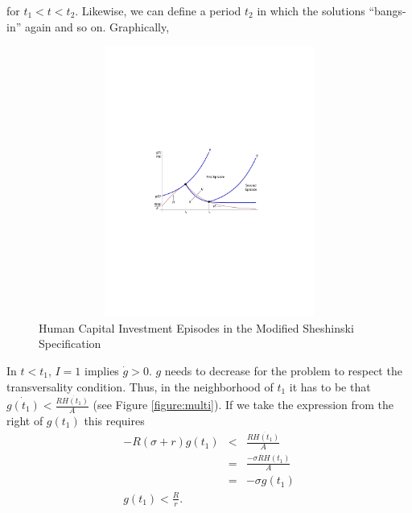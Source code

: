 \noindent for $t_{1} < t < t_{2}$. Likewise, we can define a period $t_{2}$ in which the solutions ``bangs-in'' again and so on. Graphically,

\begin{center}
\begin{figure}[H]
\caption{Human Capital Investment Episodes in the Modified Sheshinski Specification} \label{figure:multi}
\centering
\includegraphics[width=4.5in, height=3.5in]{Figures/fig-shesh-one-traj.pdf}
\end{figure}
\end{center}

\indent In $t < t_{1}$, $I = 1$ implies $\dot{g} > 0$. $g$ needs to decrease for the problem to respect the transversality condition. Thus, in the neighborhood of $t_{1}$ it has to be that $\dot{g(t_{1})} < \frac{R \dot{H(t_{1})}}{A}$ (see Figure \eqref{figure:multi}). If we take the expression from the right of $g(t_{1})$ this requires
\begin{eqnarray}
- R (\sigma + r) g(t_{1}) &<& \frac{R \dot{H(t_{1})}}{A} \nonumber \\
&=& \frac{- \sigma R H(t_{1})}{A} \nonumber \\
&=& -\sigma g(t_{1}) \nonumber \\
g(t_{1}) < \frac{R}{r}.  
\end{eqnarray}

